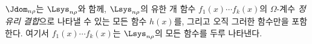 
$\Jdom_{n\rho}$는 $\Lsys_{n\rho}$와 함께, $\Lsys_{n\rho}$의 유한 개 함수 $f_1(x)\cdots f_k(x)$의 $\Omega$-계수 \emph{정유리 결합}으로 나타낼 수 있는 모든 함수 $h(x)$를, 그리고 오직 그러한 함수만을 포함한다. 여기서 $f_1(x)\cdots f_k(x)$는 $\Lsys_{n\rho}$의 모든 함수를 두루 나타낸다.
